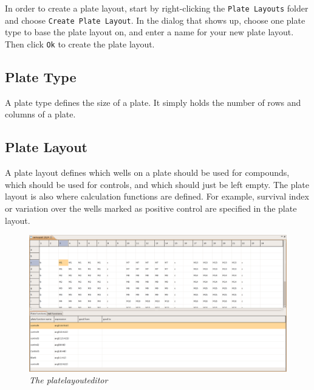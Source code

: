 \documentclass[a4paper,10pt]{article}
\begin{document}
            In order to create a plate layout, start by right-clicking the
            \texttt{Plate Layouts} folder and choose \texttt{Create Plate
            Layout}. In the dialog that shows up, choose one plate type to base
            the plate layout on, and enter a name for your new plate layout.
            Then click \texttt{Ok} to create the plate layout.

        \subsection{Plate Type} A plate type defines the size of a plate. It
            simply holds the number of rows and columns of a plate. 

        \subsection{Plate Layout}
            A plate layout defines which wells on a plate should be used for
            compounds, which should be used for controls, and which should just
            be left empty. The plate layout is also where calculation functions
            are defined. For example, survival index or variation over the
            wells marked as positive control are specified in the plate layout.

            \begin{figure}[htbp]
                \begin{center}
                    \includegraphics[width=1\textwidth]
                                    {images/plateLayoutEditor.png}
                \end{center}
                \caption{\textit{The platelayouteditor}}
                \label{platelayoutEditor}
            \end{figure}
\end{document}
